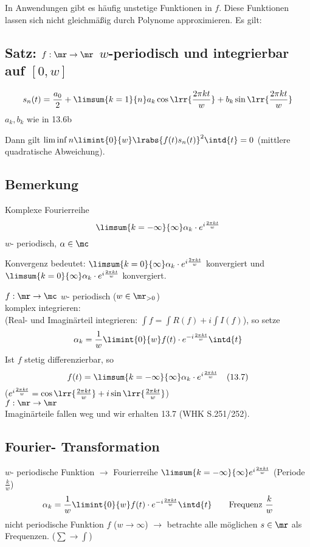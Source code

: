 	In Anwendungen gibt es häufig unstetige Funktionen in $f$. Diese Funktionen lassen sich nicht gleichmäßig durch Polynome approximieren. Es gilt:
	
\subsection{Satz: \texorpdfstring{$f:\mr\rightarrow\mr$}{Funktion von R nach R} \texorpdfstring{$w$}{w}-periodisch und integrierbar auf \texorpdfstring{$[0,w]$}{[0,w]}}
	\[s_n(t)=\dfrac{a_0}{2}+\limsum{k=1}{n}a_k\cos\lrr{\dfrac{2\pi kt}{w}}+b_k\sin\lrr{\dfrac{2\pi kt}{w}}\]
	$ a_k,b_k $ wie in 13.6b
	
	Dann gilt $ \liminf{n}\limint{0}{w}\lrabs{f(t)s_n(t)}^2\intd{t}=0 $ (mittlere quadratische Abweichung).
	
\subsection{Bemerkung}
	Komplexe Fourierreihe
	\[\limsum{k=-\infty}{\infty}\alpha_k\cdot e^{i\frac{2\pi kt}{w}}\]
	$w$- periodisch, $\alpha\in\mc$
	
	Konvergenz bedeutet:
	$\limsum{k=0}{\infty}\alpha_k\cdot e^{i\frac{2\pi kt}{w}}$ konvergiert und\\
	$\limsum{k=0}{\infty}\alpha_k\cdot e^{i\frac{2\pi kt}{w}}$ konvergiert.
	
	$f:\mr\rightarrow\mc$ $w$- periodisch ($w\in\mr_{>0}$)\\
	komplex integrieren:\\
	(Real- und Imaginärteil integrieren: $\int f=\int R(f)+i\int I(f)$), so setze
	\[ \alpha_k=\dfrac{1}{w}\limint{0}{w}f(t)\cdot e^{-i\frac{2\pi kt}{w}}\intd{t} \]
	Ist $f$ stetig differenzierbar, so
	\[f(t)=\limsum{k=-\infty}{\infty}\alpha_k\cdot e^{i\frac{2\pi kt}{w}}\quad\mbox{(13.7)}\]
	($e^{i\frac{2\pi kt}{w}}=\cos\lrr{\frac{2\pi kt}{w}}+i\sin\lrr{\frac{2\pi kt}{w}}$)\\
	$f:\mr\rightarrow\mr$\\
	Imaginärteile fallen weg und wir erhalten 13.7 (WHK S.251/252).
	
\subsection{Fourier- Transformation}
	$w$- periodische Funktion $\longrightarrow$ Fourierreihe $\limsum{k=-\infty}{\infty}e^{i\frac{2\pi kt}{w}}$ (Periode $\frac{k}{w}$)
	\[\alpha_k=\dfrac{1}{w}\limint{0}{w}f(t)\cdot e^{-i\frac{2\pi kt}{w}}\intd{t}\qquad\mbox{Frequenz }\dfrac{k}{w}\]
	nicht periodische Funktion $f$ ($w\rightarrow\infty$) $\longrightarrow$ betrachte alle möglichen $s\in\mr$ als Frequenzen. ($\sum\rightarrow\int$)
	
